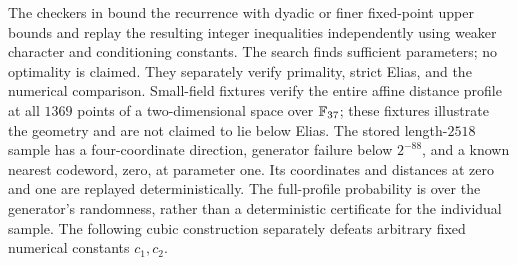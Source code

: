 The checkers in  bound the recurrence
with dyadic or finer fixed-point upper bounds and replay the resulting
integer inequalities independently using weaker character and conditioning
constants. The search finds sufficient parameters; no optimality is claimed. They separately verify primality, strict
Elias, and the numerical comparison. Small-field fixtures verify the
entire affine distance profile at all $1369$ points of a two-dimensional
space over $\mathbb F_{37}$; these fixtures illustrate the geometry and are
not claimed to lie below Elias. The stored length-$2518$ sample has a
four-coordinate direction, generator failure below $2^{-88}$, and a
known nearest codeword, zero, at parameter one. Its coordinates and distances at zero and one are
replayed deterministically. The full-profile probability is over the
generator's randomness, rather than a deterministic certificate for the
individual sample. The following cubic construction separately defeats
arbitrary fixed numerical constants $c_1,c_2$.










